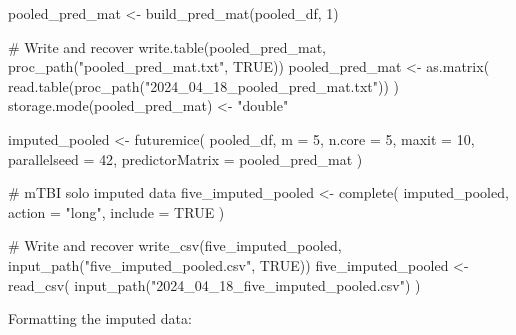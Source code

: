 \documentclass[
  letterpaper,
  DIV=11,
  numbers=noendperiod]{scrreprt}
\newenvironment{Shaded}{\begin{snugshade}}{\end{snugshade}}
\newcommand{\AttributeTok}[1]{\textcolor[rgb]{0.40,0.45,0.13}{#1}}
\newcommand{\CommentTok}[1]{\textcolor[rgb]{0.37,0.37,0.37}{#1}}
\newcommand{\ConstantTok}[1]{\textcolor[rgb]{0.56,0.35,0.01}{#1}}
\newcommand{\DecValTok}[1]{\textcolor[rgb]{0.68,0.00,0.00}{#1}}
\newcommand{\FunctionTok}[1]{\textcolor[rgb]{0.28,0.35,0.67}{#1}}
\newcommand{\NormalTok}[1]{\textcolor[rgb]{0.00,0.23,0.31}{#1}}
\newcommand{\OtherTok}[1]{\textcolor[rgb]{0.00,0.23,0.31}{#1}}
\newcommand{\StringTok}[1]{\textcolor[rgb]{0.13,0.47,0.30}{#1}}
\begin{document}
\begin{Shaded}
\begin{Highlighting}[]
\NormalTok{pooled\_pred\_mat }\OtherTok{\textless{}{-}} \FunctionTok{build\_pred\_mat}\NormalTok{(pooled\_df, }\DecValTok{1}\NormalTok{)}

\CommentTok{\# Write and recover}
\FunctionTok{write.table}\NormalTok{(pooled\_pred\_mat, }\FunctionTok{proc\_path}\NormalTok{(}\StringTok{"pooled\_pred\_mat.txt"}\NormalTok{, }\ConstantTok{TRUE}\NormalTok{))}
\NormalTok{pooled\_pred\_mat }\OtherTok{\textless{}{-}} \FunctionTok{as.matrix}\NormalTok{(}
    \FunctionTok{read.table}\NormalTok{(}\FunctionTok{proc\_path}\NormalTok{(}\StringTok{"2024\_04\_18\_pooled\_pred\_mat.txt"}\NormalTok{))}
\NormalTok{)}
\FunctionTok{storage.mode}\NormalTok{(pooled\_pred\_mat) }\OtherTok{\textless{}{-}} \StringTok{"double"}

\NormalTok{imputed\_pooled }\OtherTok{\textless{}{-}} \FunctionTok{futuremice}\NormalTok{(}
\NormalTok{    pooled\_df,}
    \AttributeTok{m =} \DecValTok{5}\NormalTok{,}
    \AttributeTok{n.core =} \DecValTok{5}\NormalTok{,}
    \AttributeTok{maxit =} \DecValTok{10}\NormalTok{,}
    \AttributeTok{parallelseed =} \DecValTok{42}\NormalTok{,}
    \AttributeTok{predictorMatrix =}\NormalTok{ pooled\_pred\_mat}
\NormalTok{)}

\CommentTok{\# mTBI solo imputed data}
\NormalTok{five\_imputed\_pooled }\OtherTok{\textless{}{-}} \FunctionTok{complete}\NormalTok{(}
\NormalTok{    imputed\_pooled,}
    \AttributeTok{action =} \StringTok{"long"}\NormalTok{,}
    \AttributeTok{include =} \ConstantTok{TRUE}
\NormalTok{)}

\CommentTok{\# Write and recover}
\FunctionTok{write\_csv}\NormalTok{(five\_imputed\_pooled, }\FunctionTok{input\_path}\NormalTok{(}\StringTok{"five\_imputed\_pooled.csv"}\NormalTok{, }\ConstantTok{TRUE}\NormalTok{))}
\NormalTok{five\_imputed\_pooled }\OtherTok{\textless{}{-}} \FunctionTok{read\_csv}\NormalTok{(}
    \FunctionTok{input\_path}\NormalTok{(}\StringTok{"2024\_04\_18\_five\_imputed\_pooled.csv"}\NormalTok{)}
\NormalTok{)}
\end{Highlighting}
\end{Shaded}

Formatting the imputed data:
\end{document}
